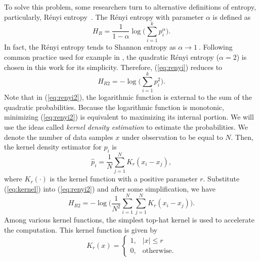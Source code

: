 \documentclass[journal,comsoc]{IEEEtran}
\begin{document}
To solve this problem, some researchers turn to alternative definitions of entropy,
particularly, R\'enyi entropy~\cite{Santamaria2002,Huang2008}.
The R\'enyi entropy  with parameter \(\alpha\) is defined as
\begin{equation}
H_{R }={\frac {1}{1-\alpha }}\log {\Bigg (}\sum _{i=1}^{k}p_{i}^{\alpha }{\Bigg )}.
\label{eq:renyi}
\end{equation}
In fact, the R\'enyi entropy tends to Shannon entropy as $\alpha \to 1~$\cite{Bromiley2004}.
Following common practice used for example in \cite{Santamaria2002}, the quadratic R\'enyi entropy ($\alpha=2$) is chosen in this work for its simplicity.
Therefore, (\ref{eq:renyi}) reduces to
\begin{equation}
H_{R2 }=-\log {\Bigg (}\sum _{i=1}^{k}p_{i}^{2 }{\Bigg )}.
\label{eq:renyi2}
\end{equation}
Note that in (\ref{eq:renyi2}), the logarithmic function is  external to the sum of the quadratic probabilities.
Because the logarithmic function is monotonic, minimizing (\ref{eq:renyi2}) is equivalent to maximizing its internal portion.
We will use the ideas called\textit{ kernel density estimation} to estimate the probabilities.
We denote the number of data samples $x$ under observation to be equal to \(N\).
Then, the kernel density estimator for $p_i$ is
\begin{equation}
{ {\hat {p}}_{i}={\frac {1}{N}}\sum _{j=1}^{N}K_{r}\left(x_i-x_j\right)},
\label{eq:kernel}
\end{equation}
where $K_r(\cdot)$ is the kernel function with a positive parameter $r$.
Substitute (\ref{eq:kernel}) into (\ref{eq:renyi2}) and after some simplification, we have
\begin{equation}
H_{R2 }=-\log {\Bigg (}\frac{1}{N^2}\sum _{i=1}^{N}\sum _{j=1}^{N}K_{r}\left(x_i-x_j\right){\Bigg )}.
\end{equation}
Among various kernel functions, the simplest top-hat kernel is used to accelerate the computation.
This kernel function is given by
\begin{equation}
{\displaystyle K_{r}(x)={\begin{cases}1,&|x|\leq r\\0,&{\mbox{otherwise.}}\end{cases}}}
\end{equation}
\end{document}
